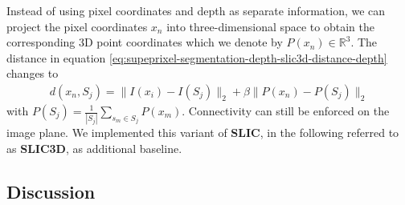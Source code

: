 Instead of using pixel coordinates and depth as separate information, we can project the pixel coordinates $x_n$ into three-dimensional space to obtain the corresponding 3D point coordinates which we denote by $P(x_n) \in \mathbb{R}^3$. The distance in equation \eqref{eq:supeprixel-segmentation-depth-slic3d-distance-depth} changes to
\begin{align}
	\label{eq:superpixel-segmentation-depth-slic3d-distance}
	d(x_n, S_j) = \|I(x_i) - I(S_j)\|_2 + \beta \| P(x_n) - P(S_j) \|_2
\end{align}
with $P(S_j) = \frac{1}{|S_j|} \sum_{s_m \in S_j} P(x_m)$. Connectivity can still be enforced on the image plane. We implemented this variant of \textbf{SLIC}, in the following referred to as \textbf{SLIC3D}, as additional baseline.

\subsection{Discussion}


